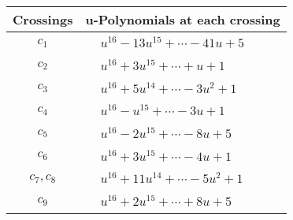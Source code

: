 \documentclass[1p]{elsarticle_modified}
\theoremstyle{definition}
\begin{document}
\begin{tabular}{m{50pt}|m{274pt}}
Crossings & \hspace{64pt}u-Polynomials at each crossing \\
\hline $$\begin{aligned}c_{1}\end{aligned}$$&$\begin{aligned}
&u^{16}-13 u^{15}+\cdots-41 u+5
\end{aligned}$\\
\hline $$\begin{aligned}c_{2}\end{aligned}$$&$\begin{aligned}
&u^{16}+3 u^{15}+\cdots+u+1
\end{aligned}$\\
\hline $$\begin{aligned}c_{3}\end{aligned}$$&$\begin{aligned}
&u^{16}+5 u^{14}+\cdots-3 u^2+1
\end{aligned}$\\
\hline $$\begin{aligned}c_{4}\end{aligned}$$&$\begin{aligned}
&u^{16}- u^{15}+\cdots-3 u+1
\end{aligned}$\\
\hline $$\begin{aligned}c_{5}\end{aligned}$$&$\begin{aligned}
&u^{16}-2 u^{15}+\cdots-8 u+5
\end{aligned}$\\
\hline $$\begin{aligned}c_{6}\end{aligned}$$&$\begin{aligned}
&u^{16}+3 u^{15}+\cdots-4 u+1
\end{aligned}$\\
\hline $$\begin{aligned}c_{7},c_{8}\end{aligned}$$&$\begin{aligned}
&u^{16}+11 u^{14}+\cdots-5 u^2+1
\end{aligned}$\\
\hline $$\begin{aligned}c_{9}\end{aligned}$$&$\begin{aligned}
&u^{16}+2 u^{15}+\cdots+8 u+5
\end{aligned}$\\

\end{tabular}
\end{document}
